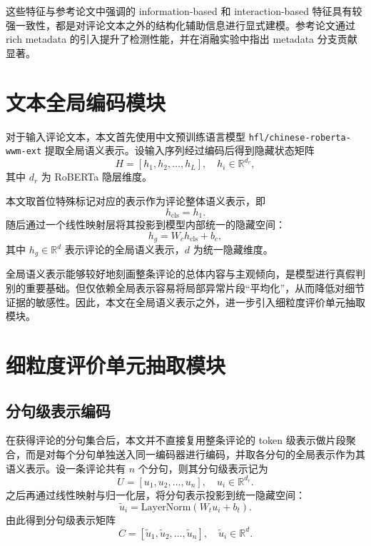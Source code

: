\documentclass[UTF8,oneside,openright,fontset=none]{ctexbook}
\numberwithin{equation}{chapter}
\begin{document}
这些特征与参考论文中强调的 information-based 和 interaction-based 特征具有较强一致性，都是对评论文本之外的结构化辅助信息进行显式建模。参考论文通过 rich metadata 的引入提升了检测性能，并在消融实验中指出 metadata 分支贡献显著。

\section{文本全局编码模块}

对于输入评论文本，本文首先使用中文预训练语言模型 \texttt{hfl/chinese-roberta-wwm-ext} 提取全局语义表示。设输入序列经过编码后得到隐藏状态矩阵
\begin{equation}
  H=[h_1,h_2,\ldots,h_L], \quad h_i \in \mathbb{R}^{d_r},
\end{equation}
其中 $d_r$ 为 RoBERTa 隐层维度。

本文取首位特殊标记对应的表示作为评论整体语义表示，即
\begin{equation}
  h_{\mathrm{cls}} = h_1.
\end{equation}
随后通过一个线性映射层将其投影到模型内部统一的隐藏空间：
\begin{equation}
  h_g = W_c h_{\mathrm{cls}} + b_c,
\end{equation}
其中 $h_g \in \mathbb{R}^{d}$ 表示评论的全局语义表示，$d$ 为统一隐藏维度。

全局语义表示能够较好地刻画整条评论的总体内容与主观倾向，是模型进行真假判别的重要基础。但仅依赖全局表示容易将局部异常片段“平均化”，从而降低对细节证据的敏感性。因此，本文在全局语义表示之外，进一步引入细粒度评价单元抽取模块。

\section{细粒度评价单元抽取模块}

\subsection{分句级表示编码}

在获得评论的分句集合后，本文并不直接复用整条评论的 token 级表示做片段聚合，而是对每个分句单独送入同一编码器进行编码，并取各分句的全局表示作为其语义表示。设一条评论共有 $n$ 个分句，则其分句级表示记为
\begin{equation}
  U=[u_1,u_2,\ldots,u_n], \quad u_i \in \mathbb{R}^{d_r}.
\end{equation}
之后再通过线性映射与归一化层，将分句表示投影到统一隐藏空间：
\begin{equation}
  \tilde{u}_i = \mathrm{LayerNorm}(W_t u_i + b_t).
\end{equation}
由此得到分句级表示矩阵
\begin{equation}
  C=[\tilde{u}_1,\tilde{u}_2,\ldots,\tilde{u}_n], \quad \tilde{u}_i \in \mathbb{R}^{d}.
\end{equation}
\end{document}
